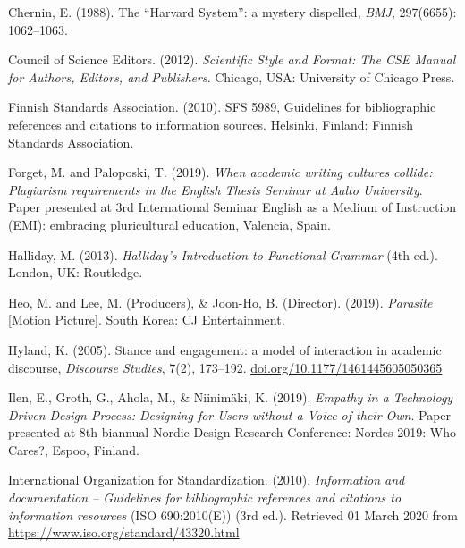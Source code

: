 \documentclass[english, 12pt, a4paper, sci, utf8, a-2b, online]{aaltothesis}
\begin{document}
\vspace{1ex}
\noindent
Chernin, E. (1988). 
The “Harvard System”: a mystery dispelled, \textit{BMJ}, 297(6655): 1062--1063.

\vspace{1ex}
\noindent
Council of Science Editors. (2012). 
\textit{Scientific Style and Format: The CSE Manual for Authors, Editors, and
	Publishers}. 
Chicago, USA: University of Chicago Press.

\vspace{1ex}
\noindent
Finnish Standards Association. (2010). SFS 5989, Guidelines for bibliographic 
references and citations to information sources. Helsinki, Finland: Finnish 
Standards Association.

\vspace{1ex}
\noindent
Forget, M. and Paloposki, T. (2019). 
\textit{When academic writing cultures collide: Plagiarism requirements in the 
	English Thesis Seminar at Aalto University}. 
Paper presented at 3rd International Seminar English as a Medium of Instruction 
(EMI): embracing pluricultural education, Valencia, Spain.

\vspace{1ex}
\noindent
Halliday, M. (2013). \textit{Halliday’s Introduction to Functional Grammar} 
(4th ed.). London, UK: Routledge.

\vspace{1ex}
\noindent
Heo, M. and Lee, M. (Producers), \& Joon-Ho, B. (Director). (2019). 
\textit{Parasite} [Motion Picture]. South Korea: CJ Entertainment.

\vspace{1ex}
\noindent
Hyland, K. (2005). 
Stance and engagement: a model of interaction in academic discourse, 
\textit{Discourse Studies}, 7(2), 173--192. 
\url{doi.org/10.1177/1461445605050365}

\vspace{1ex}
\noindent
Ilen, E., Groth, G., Ahola, M., \& Niinimäki, K. (2019). 
\textit{Empathy in a Technology Driven Design Process: Designing for Users 
	without a Voice of their Own}. 
Paper presented at 8th biannual Nordic Design Research Conference: Nordes 2019: 
Who Cares?, Espoo, Finland.

\vspace{1ex}
\noindent
International Organization for Standardization. (2010). 
\textit{Information and documentation -- Guidelines for bibliographic references
	and citations to information resources} 
(ISO 690:2010(E)) (3rd ed.). Retrieved 01 March 2020 from 
\url{https://www.iso.org/standard/43320.html}
\end{document}
